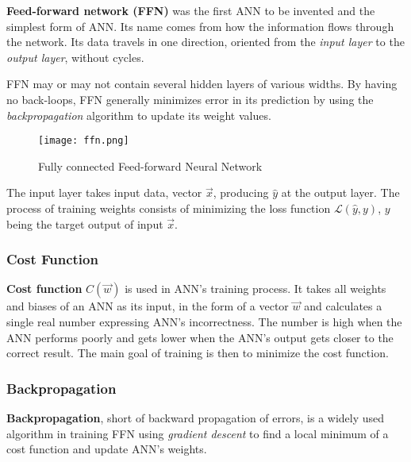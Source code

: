 \textbf{Feed-forward network (FFN)} was the first ANN to be invented and the simplest form of ANN. Its name comes from how the information flows through the network. Its data travels in one direction, oriented from the \textit{input layer} to the \textit{output layer}, without cycles.\cite{ffnbrilliant} 

FFN may or may not contain several hidden layers of various widths. By having no back-loops, FFN generally minimizes error in its prediction by using the \textit{backpropagation} algorithm to update its weight values.\cite{mainTypesANN}

\begin{figure}[h]
	\centering
    \texttt{[image: ffn.png]}
	\caption{Fully connected Feed-forward Neural Network \cite{matous}}
	\label{fig:ffn}
\end{figure}

The input layer takes input data, vector $\vec{x}$, producing $\hat{y}$ at the output layer. The process of training weights
 consists of minimizing the loss function $\mathcal{L}(\hat{y},y)$, $y$ being the target output of input $\vec{x}$.\cite{lipton2015critical}


\subsubsection{Cost Function}
\textbf{Cost function} $C(\vec{w})$ is used in ANN's training process. It takes all weights and biases of an ANN as its input, in the form of a vector $\vec{w}$ and calculates a single real number expressing ANN's incorrectness.\cite{Goodfellow-et-al-2016} The number is high when the ANN performs poorly and gets lower when the ANN's output gets closer to the correct result. The main goal of training is then to minimize the cost function. 

\subsubsection{Backpropagation}
\textbf{Backpropagation}, short of backward propagation of errors, is a widely used algorithm in training FFN using \textit{gradient descent} to find a local minimum of a cost function and update ANN's weights.\cite{birlliantbackprop}

